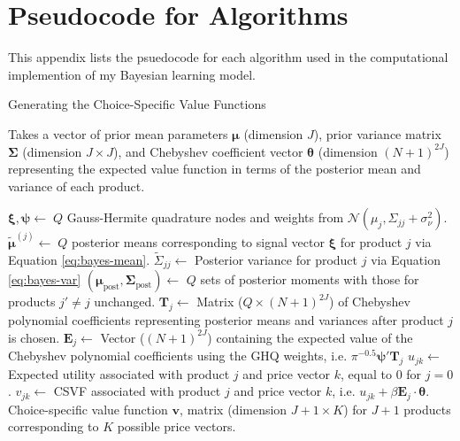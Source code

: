 \documentclass[11pt]{article}
\newcommand{\N}{\mathcal{N}}
\begin{document}
\section{Pseudocode for Algorithms}
This appendix lists the psuedocode for each algorithm used in the computational implemention of my Bayesian learning model.
\vfill
\begin{algorithm}[!htpb]
	\caption{Generating the Choice-Specific Value Functions} \label{alg_csvf}
    \vspace{1em} 
	Takes a vector of prior mean parameters $\boldsymbol{\mu}$ (dimension $J$), prior variance matrix $\boldsymbol{\Sigma}$ (dimension $J \times J$), and Chebyshev coefficient vector $\boldsymbol{\theta}$ (dimension ${(N + 1)}^{2J}$) representing the expected value function in terms of the posterior mean and variance of each product. \vspace{1em} 
    \begin{onehalfspace}
	\begin{algorithmic}[1]
     
     
	\State $\boldsymbol{\xi}, \boldsymbol{\psi} \gets \; Q$ Gauss-Hermite quadrature nodes and weights from $\N\left(\mu_j, \Sigma_{jj} + \sigma_\nu^2\right)$.
    \State $\widetilde{\boldsymbol{\mu}}^{(j)} \gets \; Q$ posterior means corresponding to signal vector $\boldsymbol{\xi}$ for product $j$ via Equation \ref{eq:bayes-mean}.
    \State $\widetilde{\Sigma}_{jj} \gets $ Posterior variance for product $j$ via Equation \ref{eq:bayes-var}
    \State $(\boldsymbol{\mu}_{\text{post}}, \boldsymbol{\Sigma}_{\text{post}} ) \gets $ $Q$ sets of posterior moments with those for products $j' \neq j$ unchanged.
    \State $\boldsymbol{T}_j \gets $ Matrix ($Q \times {(N + 1)}^{2J}$) of Chebyshev polynomial coefficients representing posterior means and variances after product $j$ is chosen.
    \State $\boldsymbol{E}_j \gets$ Vector (${(N + 1)}^{2J}$) containing the expected value of the Chebyshev polynomial coefficients using the GHQ weights, i.e. $\pi^{-0.5} \boldsymbol{\psi} ' \boldsymbol{T}_j$
	\State $u_{jk} \gets $ Expected utility associated with product $j$ and price vector $k$, equal to $0$ for $j = 0$.
	\State $v_{jk} \gets $ CSVF associated with product $j$ and price vector $k$, i.e. $u_{jk} + \beta \boldsymbol{E}_j \cdot \boldsymbol{\theta}$.
    \EndFor
    \EndFor
	\\
	\Return Choice-specific value function $\boldsymbol{v}$, matrix (dimension $J 
    +1 \times K$) for $J + 1$ products corresponding to $K$ possible price vectors.
    \EndFunction 
	\end{algorithmic}
    \end{onehalfspace}
	\vspace{0.5em} 
\end{algorithm}
\vfill
\end{document}
